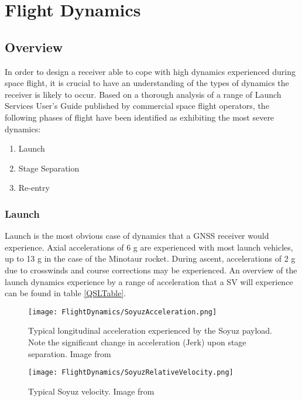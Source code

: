 \label{app1}
\chapter{Flight Dynamics}

\section{Overview}
In order to design a receiver able to cope with high dynamics experienced during space flight, it is crucial to have an understanding of the types of dynamics the receiver is likely to occur. Based on a thorough analysis of a range of Launch Services User's Guide published by commercial space flight operators, the following phases of flight have been identified as exhibiting the most severe dynamics: 

\begin{enumerate}
\item{Launch}
\item{Stage Separation}
\item{Re-entry}
\end{enumerate}

\subsection{Launch}
Launch is the most obvious case of dynamics that a \ac{GNSS} receiver would experience. Axial accelerations of 6 g are experienced with most launch vehicles, up to 13 g in the case of the Minotaur rocket. During ascent, accelerations of 2 g due to crosswinds and course corrections may be experienced. An overview of the launch dynamics experience by a range of acceleration that a \ac{SV} will experience can be found in table \ref{QSLTable}.

\begin{figure}[!htb] 
    \centering
    \texttt{[image: FlightDynamics/SoyuzAcceleration.png]} 
    \caption{Typical longitudinal acceleration experienced by the Soyuz payload. Note the significant change in acceleration (Jerk) upon stage separation. Image from \cite{Soyuz}}
    \label{fig:SoyuzAcceleration}
\end{figure}

\begin{figure}[!htb] 
    \centering
    \texttt{[image: FlightDynamics/SoyuzRelativeVelocity.png]} 
    \caption{Typical Soyuz velocity. Image from \cite{Soyuz}}
    \label{fig:SoyuzRelativeVelocity}
\end{figure}



